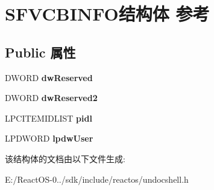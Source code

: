 \hypertarget{struct_s_f_v_c_b_i_n_f_o}{}\section{S\+F\+V\+C\+B\+I\+N\+F\+O结构体 参考}
\label{struct_s_f_v_c_b_i_n_f_o}
\subsection*{Public 属性}
\begin{DoxyCompactItemize}
\item 
\mbox{\label{struct_s_f_v_c_b_i_n_f_o_a66ca3cd1148a47e12d3fb6dfc2582120}} 
D\+W\+O\+RD {\bfseries dw\+Reserved}
\item 
\mbox{\label{struct_s_f_v_c_b_i_n_f_o_aa119d765f0de889d0a4d4511852f018a}} 
D\+W\+O\+RD {\bfseries dw\+Reserved2}
\item 
\mbox{\label{struct_s_f_v_c_b_i_n_f_o_a7cff92c0e45bae63762f84bb00e4f5ef}} 
L\+P\+C\+I\+T\+E\+M\+I\+D\+L\+I\+ST {\bfseries pidl}
\item 
\mbox{\label{struct_s_f_v_c_b_i_n_f_o_a54a6868c46cf4991ef4e3a71fcd12728}} 
L\+P\+D\+W\+O\+RD {\bfseries lpdw\+User}
\end{DoxyCompactItemize}


该结构体的文档由以下文件生成\+:\begin{DoxyCompactItemize}
\item 
E\+:/\+React\+O\+S-\/0../sdk/include/reactos/undocshell.\+h\end{DoxyCompactItemize}
